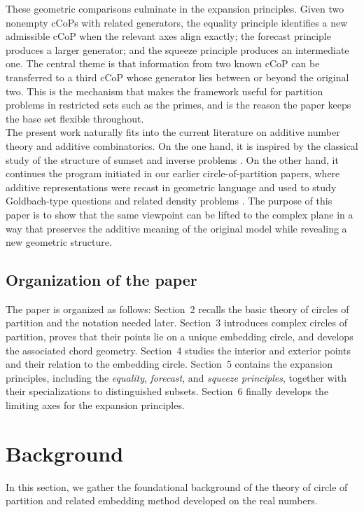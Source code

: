 \documentclass[12pt]{amsart}
\theoremstyle{definition}
\theoremstyle{remark}
\numberwithin{equation}{section}
\begin{document}
These geometric comparisons culminate in the expansion principles. Given two nonempty cCoPs with related generators, the equality principle identifies a new admissible cCoP when the relevant axes align exactly; the forecast principle produces a larger generator; and the squeeze principle produces an intermediate one. The central theme is that information from two known cCoP can be transferred to a third cCoP whose generator lies between or beyond the original two. This is the mechanism that makes the framework useful for partition problems in restricted sets such as the primes, and is the reason the paper keeps the base set flexible throughout.\\

The present work naturally fits into the current literature on additive number theory and additive combinatorics. On the one hand, it is inspired by the classical study of the structure of sumset and inverse problems \cite{Nathanson,TaoVu}. On the other hand, it continues the program initiated in our earlier circle-of-partition papers, where additive representations were recast in geometric language and used to study Goldbach-type questions and related density problems \cite{CoP,Goldbach,Squeeze}. The purpose of this paper is to show that the same viewpoint can be lifted to the complex plane in a way that preserves the additive meaning of the original model while revealing a new geometric structure.

\subsection{Organization of the paper} The paper is organized as follows: Section~2 recalls the basic theory of circles of partition and the notation needed later. Section~3 introduces complex circles of partition, proves that their points lie on a unique embedding circle, and develops the associated chord geometry. Section~4 studies the interior and exterior points and their relation to the embedding circle. Section~5 contains the expansion principles, including the \emph{equality}, \emph{forecast}, and \emph{squeeze principles}, together with their specializations to distinguished subsets. Section~6 finally develops the limiting axes for the expansion principles.

\section{Background}

In this section, we gather the foundational background of the theory of circle of partition and related embedding method developed on the real numbers.
\end{document}
